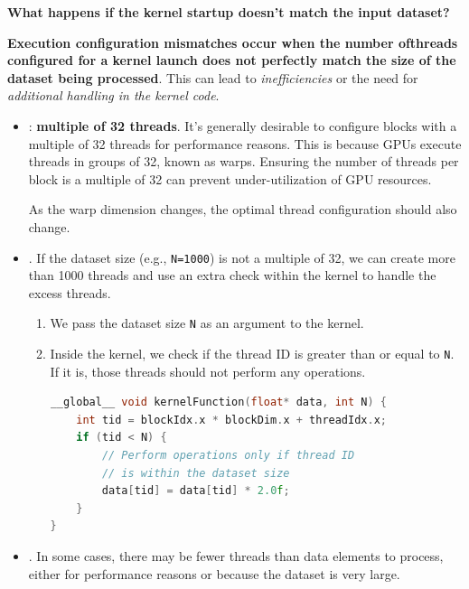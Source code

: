 \highspace
\begin{flushleft}
    \textcolor{Red2}{ \textbf{What happens if the kernel startup doesn't match the input dataset?}}
\end{flushleft}
\textbf{Execution configuration mismatches occur when the number of\break threads configured for a kernel launch does not perfectly match the size of the dataset being processed}. This can lead to \emph{inefficiencies} or the need for \emph{additional handling in the kernel code}.
\begin{itemize}
    \item {}: \textbf{multiple of 32 threads}. It's generally desirable to configure blocks with a multiple of 32 threads for performance reasons. This is because GPUs execute threads in groups of 32, known as warps. Ensuring the number of threads per block is a multiple of 32 can prevent under-utilization of GPU resources.

    As the warp dimension changes, the optimal thread configuration should also change.

    \item {}. If the dataset size (e.g., \texttt{N=1000}) is not a multiple of 32, we can create more than 1000 threads and use an extra check within the kernel to handle the excess threads.
    \begin{enumerate}
        \item We pass the dataset size \texttt{N} as an argument to the kernel.
        \item Inside the kernel, we check if the thread ID is greater than or equal to \texttt{N}. If it is, those threads should not perform any operations.
        \begin{lstlisting}[language=C++]
__global__ void kernelFunction(float* data, int N) {
    int tid = blockIdx.x * blockDim.x + threadIdx.x;
    if (tid < N) {
        // Perform operations only if thread ID
        // is within the dataset size
        data[tid] = data[tid] * 2.0f;
    }
}
        \end{lstlisting}
    \end{enumerate}

    \item {}. In some cases, there may be fewer threads than data elements to process, either for performance reasons or because the dataset is very large.


\end{itemize}
